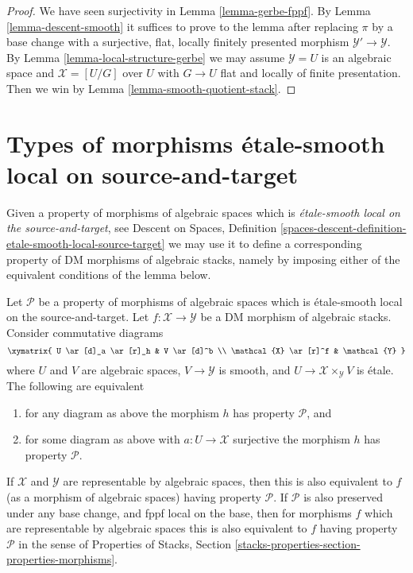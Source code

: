 \begin{proof}
We have seen surjectivity in Lemma \ref{lemma-gerbe-fppf}.
By Lemma \ref{lemma-descent-smooth}
it suffices to prove to the lemma after replacing $\pi$ by a base change
with a surjective, flat, locally finitely presented morphism
$\mathcal{Y}' \to \mathcal{Y}$. By
Lemma \ref{lemma-local-structure-gerbe}
we may assume $\mathcal{Y} = U$ is an algebraic space and
$\mathcal{X} = [U/G]$ over $U$ with $G \to U$ flat and
locally of finite presentation.
Then we win by Lemma \ref{lemma-smooth-quotient-stack}.
\end{proof}





\section{Types of morphisms \'etale-smooth local on source-and-target}
\label{section-etale-smooth-local-source-target}

\noindent
Given a property of morphisms of algebraic spaces which is
{\it \'etale-smooth local on the source-and-target}, see
Descent on Spaces,
Definition \ref{spaces-descent-definition-etale-smooth-local-source-target}
we may use it to define a corresponding
property of DM morphisms of algebraic stacks, namely by imposing either of
the equivalent conditions of the lemma below.

\begin{lemma}
\label{lemma-etale-smooth-local-source-target}
Let $\mathcal{P}$ be a property of morphisms of algebraic spaces
which is \'etale-smooth local on the source-and-target.
Let $f : \mathcal{X} \to \mathcal{Y}$ be a DM morphism of algebraic stacks.
Consider commutative diagrams
$$
\xymatrix{
U \ar[d]_a \ar[r]_h & V \ar[d]^b \\
\mathcal{X} \ar[r]^f & \mathcal{Y}
}
$$
where $U$ and $V$ are algebraic spaces, $V \to \mathcal{Y}$ is smooth,
and $U \to \mathcal{X} \times_\mathcal{Y} V$ is \'etale.
The following are equivalent
\begin{enumerate}
\item for any diagram as above the morphism $h$ has property $\mathcal{P}$, and
\item for some diagram as above with $a : U \to \mathcal{X}$ surjective
the morphism $h$ has property $\mathcal{P}$.
\end{enumerate}
If $\mathcal{X}$ and $\mathcal{Y}$ are representable by algebraic spaces,
then this is also equivalent to $f$ (as a morphism of algebraic spaces)
having property $\mathcal{P}$. If $\mathcal{P}$ is also preserved under
any base change, and fppf local on the base, then for morphisms $f$
which are representable by algebraic spaces this
is also equivalent to $f$ having property $\mathcal{P}$ in the sense
of
Properties of Stacks,
Section \ref{stacks-properties-section-properties-morphisms}.
\end{lemma}

